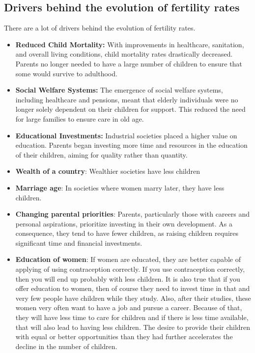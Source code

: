\documentclass[../summary.tex]{subfiles}
\begin{document}
	\subsection{Drivers behind the evolution of fertility rates}
	
	There are a lot of drivers behind the evolution of fertility rates.
	
	\begin{itemize}
		\item \textbf{Reduced Child Mortality:} With improvements in healthcare, sanitation, and overall living conditions, child mortality rates drastically decreased. Parents no longer needed to have a large number of children to ensure that some would survive to adulthood.
		\item \textbf{Social Welfare Systems:} The emergence of social welfare systems, including healthcare and pensions, meant that elderly individuals were no longer solely dependent on their children for support. This reduced the need for large families to ensure care in old age.
		\item \textbf{Educational Investments:} Industrial societies placed a higher value on education. Parents began investing more time and resources in the education of their children, aiming for quality rather than quantity.
		\item \textbf{Wealth of a country}: Wealthier societies have less children
		\item \textbf{Marriage age}: In societies where women marry later, they have less children.
		\item \textbf{Changing parental priorities}: Parents, particularly those with careers and personal aspirations, prioritize investing in their own development. As a consequence, they tend to have fewer children, as raising children requires significant time and financial investments.
		\item \textbf{Education of women}: If women are educated, they are better capable of applying of using contraception correctly. If you use contraception correctly, then you will end up probably with less children. It is also true that if you offer education to women, then of course they need to invest time in that and very few people have children while they study. Also, after their studies, these women very often want to have a job and pursue a career. Because of that, they will have less time to care for children and if there is less time available, that will also lead to having less children. The desire to provide their children with equal or better opportunities than they had further accelerates the decline in the number of children.
	\end{itemize}
	
\end{document}
